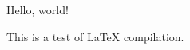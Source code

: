 \documentclass{article}
\begin{document}
Hello, world!

This is a test of LaTeX compilation.
\end{document}
